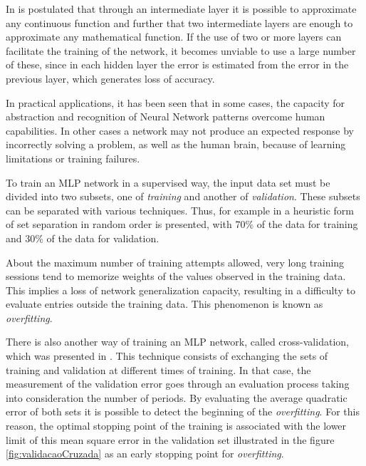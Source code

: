             In  is postulated that through an intermediate layer it is possible to approximate any continuous function and further that two intermediate layers are enough to approximate any mathematical function. If the use of two or more layers can facilitate the training of the network, it becomes unviable to use a large number of these, since in each hidden layer the error is estimated from the error in the previous layer, which generates loss of accuracy.
            
            In practical applications, it has been seen that in some cases, the capacity for abstraction and recognition of Neural Network patterns overcome human capabilities. In other cases a network may not produce an expected response by incorrectly solving a problem, as well as the human brain, because of learning limitations or training failures. 
              
            To train an MLP network in a supervised way, the input data set must be divided into two subsets, one of \textit{training} and another of \textit{validation}. These subsets can be separated with various techniques. Thus, for example in  a heuristic form of set separation in random order is presented, with 70\% of the data for training and 30\% of the data for validation.
            
            About the maximum number of training attempts allowed, very long training sessions tend to memorize weights of the values observed in the training data.  This implies a loss of network generalization capacity, resulting in a difficulty to evaluate entries outside the training data. This phenomenon is known as \textit{overfitting}.
            
            There is also another way of training an MLP network, called cross-validation, which was presented in \cite{crossvalidation}. This technique consists of exchanging the sets of training and validation at different times of training. In that case, the measurement of the validation error goes through an evaluation process taking into consideration the number of periods. By evaluating the average quadratic error of both sets it is possible to detect the beginning of the \textit{overfitting}. For this reason, the optimal stopping point of the training is associated with the lower limit of this mean square error in the validation set illustrated in the figure \ref{fig:validacaoCruzada} as an early stopping point for \textit{overfitting}.
            

